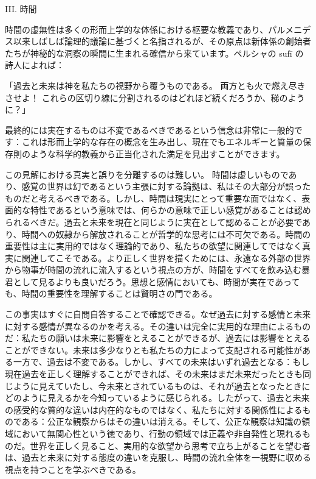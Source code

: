 \documentclass[a4paper,11pt,openany]{ltjsbook}
\begin{document}
III. 時間

時間の虚無性は多くの形而上学的な体係における枢要な教義であり、パルメニデス以来しばしば論理的議論に基づくと名指されるが、その原点は新体係の創始者たちが神秘的な洞察の瞬間に生まれる確信から来ています。ペルシャの sufī の詩人によれば：

「過去と未来は神を私たちの視野から覆うものである。
両方とも火で燃え尽きさせよ！
これらの区切り線に分割されるのはどれほど続くだろうか、稊のように？」

最終的には実在するものは不変であるべきであるという信念は非常に一般的です：これは形而上学的な存在の概念を生み出し、現在でもエネルギーと質量の保存則のような科学的教義から正当化された満足を見出すことができます。

この見解における真実と誤りを分離するのは難しい。
時間は虚しいものであり、感覚の世界は幻であるという主張に対する論拠は、私はその大部分が誤ったものだと考えるべきである。しかし、時間は現実にとって重要な面ではなく、表面的な特性であるという意味では、何らかの意味で正しい感覚があることは認められるべきだ。過去と未来を現在と同じように実在として認めることが必要であり、時間への奴隷から解放されることが哲学的な思考には不可欠である。時間の重要性は主に実用的ではなく理論的であり、私たちの欲望に関連してではなく真実に関連してこそである。より正しく世界を描くためには、永遠なる外部の世界から物事が時間の流れに流入するという視点の方が、時間をすべてを飲み込む暴君として見るよりも良いだろう。思想と感情においても、時間が実在であっても、時間の重要性を理解することは賢明さの門である。

この事実はすぐに自問自答することで確認できる。なぜ過去に対する感情と未来に対する感情が異なるのかを考える。その違いは完全に実用的な理由によるものだ：私たちの願いは未来に影響をとえることができるが、過去には影響をとえることができない。未来は多少なりとも私たちの力によって支配される可能性がある一方で、過去は不変である。しかし、すべての未来はいずれ過去となる：もし現在過去を正しく理解することができれば、その未来はまだ未来だったときも同じように見えていたし、今未来とされているものは、それが過去となったときにどのように見えるかを今知っているように感じられる。したがって、過去と未来の感受的な質的な違いは内在的なものではなく、私たちに対する関係性によるものである：公正な観察からはその違いは消える。そして、公正な観察は知識の領域において無関心性という徳であり、行動の領域では正義や非自発性と現れるものだ。世界を正しく見ること、実用的な欲望から思考で立ち上がることを望む者は、過去と未来に対する態度の違いを克服し、時間の流れ全体を一視野に収める視点を持つことを学ぶべきである。
\end{document}
